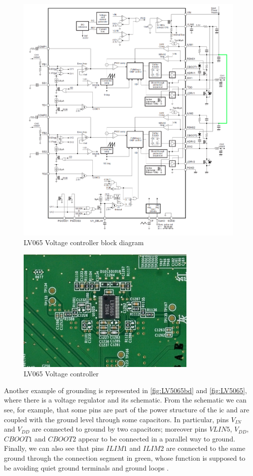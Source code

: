 \documentclass[11pt,a4paper,titlepage]{article}
\begin{document}
		  \begin{figure}[htbp]
					\centering
				  \includegraphics[width = \textwidth]{LV5065_block_diag.png}
				  \caption{LV065 Voltage controller block diagram}
				  \label{fig:LV5065bd}
			\end{figure}
		  \begin{figure}[htbp]
				\centering
				\includegraphics[width =.6\textwidth]{LV5065.png}
				\caption{LV065 Voltage controller}
				\label{fig:LV5065}
		  \end{figure}

		  Another example of grounding is represented in \autoref{fig:LV5065bd} and \autoref{fig:LV5065}, where there is a voltage regulator and its schematic. From the schematic we can see, for example, that some pins are part of the power structure of the \gls{ic} and are coupled with the ground level through some capacitors. In particular, pins $V_{IN}$ and $V_{DD}$ are connected to ground by two capacitors; moreover pins $VLIN5$, $V_{DD}$, $CBOOT1$ and $CBOOT2$ appear to be connected in a parallel way to ground. Finally, we can also see that pins $ILIM1$ and $ILIM2$ are connected to the same ground through the connection segment in green, whose function is supposed to be avoiding quiet ground terminals and ground loops \cite{DCcontroller}.
\end{document}
